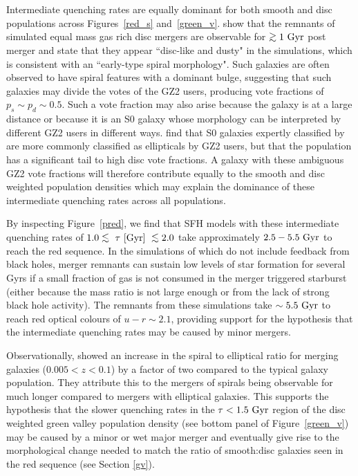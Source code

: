 Intermediate quenching rates are equally dominant for both smooth and disc populations across Figures~\ref{red_s} and~\ref{green_v}. \citet{lotz08b} show that the remnants of simulated equal mass gas rich disc mergers are observable for $\gtrsim1~\rm{Gyr}$ post merger and state that they appear ``disc-like and dusty" in the simulations, which is consistent with an ``early-type spiral morphology".  Such galaxies are often observed to have spiral features with a dominant bulge, suggesting that such galaxies may divide the votes of the GZ2 users, producing vote fractions of $p_s \sim p_d \sim 0.5$. Such a vote fraction may also arise because the galaxy is at a large distance or because it is an S0 galaxy whose morphology can be interpreted by different GZ2 users in different ways. \citet{GZ2} find that S0 galaxies expertly classified by \citet{nair10} are more commonly classified as ellipticals by GZ2 users, but that the population has a significant tail to high disc vote fractions. A galaxy with these ambiguous GZ2 vote fractions will therefore contribute equally to the smooth and disc weighted population densities which may explain the dominance of these intermediate quenching rates across all populations. 

By inspecting Figure~\ref{pred}, we find that SFH models with these intermediate quenching rates of $1.0 \lesssim ~\tau~\rm{[Gyr]} ~\lesssim 2.0$ take approximately $2.5-5.5~\rm{Gyr}$ to reach the red sequence. In the simulations of \citet*{springel05b} which do not include feedback from black holes, merger remnants can sustain low levels of star formation for several Gyrs if a small fraction of gas is not consumed in the merger triggered starburst (either because the mass ratio is not large enough or from the lack of strong black hole activity). The remnants from these simulations take $\sim5.5~\rm{Gyr}$ to reach red optical colours of $u-r \sim 2.1$, providing support for the hypothesis that the intermediate quenching rates may be caused by minor mergers. 

Observationally, \citet{Darg10a} showed an increase in the spiral to elliptical ratio for merging galaxies ($0.005 < z < 0.1$) by a factor of two compared to the typical galaxy population. They attribute this to the mergers of spirals being observable for much longer compared to mergers with elliptical galaxies. This supports the hypothesis that the slower quenching rates in the $\tau < 1.5 ~\rm{Gyr}$ region of the disc weighted green valley population density (see bottom panel of Figure~\ref{green_v}) may be caused by a minor or wet major merger and eventually give rise to the morphological change needed to match the ratio of smooth:disc galaxies seen in the red sequence (see Section \ref{gv}). 
 
